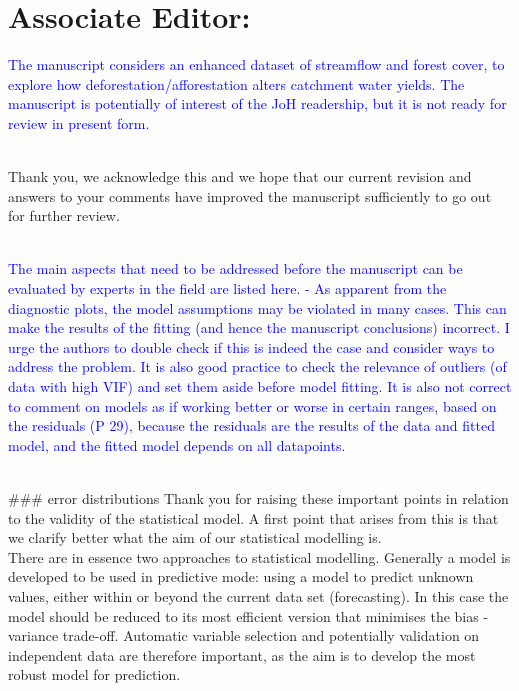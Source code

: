 \documentclass[]{elsarticle} %
\begin{document}
\hypertarget{associate-editor}{%
\section{Associate Editor:}\label{associate-editor}}

\textcolor{blue}{The manuscript considers an enhanced dataset of streamflow and forest cover, to explore how deforestation/afforestation alters catchment water yields. The manuscript is potentially of interest of the JoH readership, but it is not ready for review in present form.}\\
\strut \\
Thank you, we acknowledge this and we hope that our current revision and answers to your comments have improved the manuscript sufficiently to go out for further review.\\
\strut \\
\textcolor{blue}{The main aspects that need to be addressed before the manuscript can be evaluated by experts in the field are listed here. 
- As apparent from the diagnostic plots, the model assumptions may be violated in many cases. This can make the results of the fitting (and hence the manuscript conclusions) incorrect. I urge the authors to double check if this is indeed the case and consider ways to address the problem. It is also good practice to check the relevance of outliers (of data with high VIF) and set them aside before model fitting. It is also not correct to comment on models as if working better or worse in certain ranges, based on the residuals (P 29), because the residuals are the results of the data and fitted model, and the fitted model depends on all datapoints.}\\
\strut \\
\#\#\# error distributions
Thank you for raising these important points in relation to the validity of the statistical model.
A first point that arises from this is that we clarify better what the aim of our statistical modelling is.\\
There are in essence two approaches to statistical modelling. Generally a model is developed to be used in predictive mode: using a model to predict unknown values, either within or beyond the current data set (forecasting). In this case the model should be reduced to its most efficient version that minimises the bias - variance trade-off. Automatic variable selection and potentially validation on independent data are therefore important, as the aim is to develop the most robust model for prediction.\\
\end{document}
